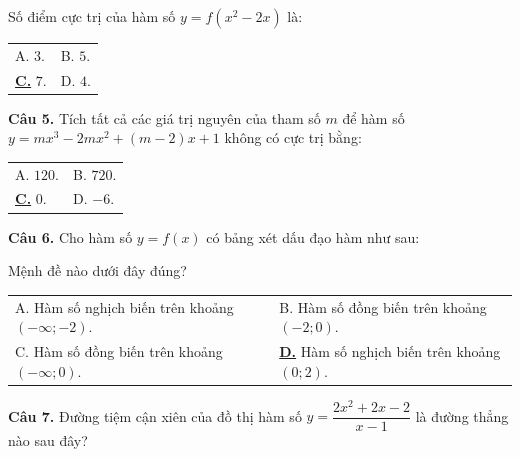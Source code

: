 \documentclass[12pt,a4paper]{article}
\makeatletter
\newcommand{\choiceC}[4]{

    \par\vspace{0.5em}\noindent

    \begin{tabularx}{\textwidth}{@{}X X@{}}

    A. #1 & B. #2 \\[1.2em]

    \underline{\textbf{C.}} #3 & D. #4

    \end{tabularx}

}
\newcommand{\choiceD}[4]{

    \par\vspace{0.5em}\noindent

    \begin{tabularx}{\textwidth}{@{}X X@{}}

    A. #1 & B. #2 \\[1.2em]

    C. #3 & \underline{\textbf{D.}} #4

    \end{tabularx}

}
\makeatother
\begin{document}
Số điểm cực trị của hàm số $y = f(x^2 - 2x)$ là:

\choiceC{$3$.}{$5$.}{$7$.}{$4$.}



\textbf{Câu 5.} Tích tất cả các giá trị nguyên của tham số $m$ để hàm số $y = mx^3 - 2mx^2 + (m-2)x + 1$ không có cực trị bằng:

\choiceC{$120$.}{$720$.}{$0$.}{$-6$.}



\textbf{Câu 6.} Cho hàm số $y=f(x)$ có bảng xét dấu đạo hàm như sau:

\begin{center}


\end{center}

Mệnh đề nào dưới đây đúng?

\choiceD{Hàm số nghịch biến trên khoảng $(-\infty; -2)$.}{Hàm số đồng biến trên khoảng $(-2; 0)$.}{Hàm số đồng biến trên khoảng $(-\infty; 0)$.}{Hàm số nghịch biến trên khoảng $(0; 2)$.}



\textbf{Câu 7.} Đường tiệm cận xiên của đồ thị hàm số $y = \dfrac{2x^2 + 2x - 2}{x - 1}$ là đường thẳng nào sau đây?
\end{document}
